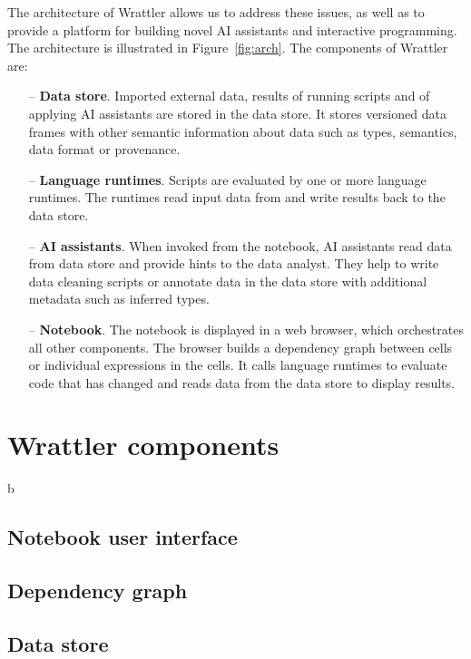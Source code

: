 \documentclass[sigplan,preprint,10pt]{acmart}\settopmatter{printfolios=true,printccs=false,printacmref=false}
\theoremstyle{plain}
\theoremstyle{definition}
\begin{document}
The architecture of Wrattler allows us to address these issues, as well as to provide a platform
for building novel AI assistants and interactive programming. The architecture is illustrated
in Figure~\ref{fig:arch}. The components of Wrattler are:
%
\begin{itemize}
\item[--] \textbf{Data store}. Imported external data, results of running scripts and of 
  applying AI assistants are stored in the data store. It stores versioned data frames with 
  other semantic information about data such as types, semantics, data format or provenance.
\vspace{0.25em}
\item[--] \textbf{Language runtimes}. Scripts are evaluated by one or more language runtimes.
  The runtimes read input data from and write results back to the data store.
\vspace{0.25em}
\item[--] \textbf{AI assistants}. When invoked from the notebook, AI assistants read data
  from data store and provide hints to the data analyst. They help to write data cleaning
  scripts or annotate data in the data store with additional metadata such as inferred types.
\vspace{0.25em}
\item[--] \textbf{Notebook}. The notebook is displayed in a web browser, which orchestrates 
  all other components. The browser builds a dependency graph between cells or individual 
  expressions in the cells. It calls language runtimes to evaluate code that has changed
  and reads data from the data store to display results.  
\end{itemize}

\section{Wrattler components}

b

\subsection{Notebook user interface}

\subsection{Dependency graph}

\subsection{Data store}
\end{document}
